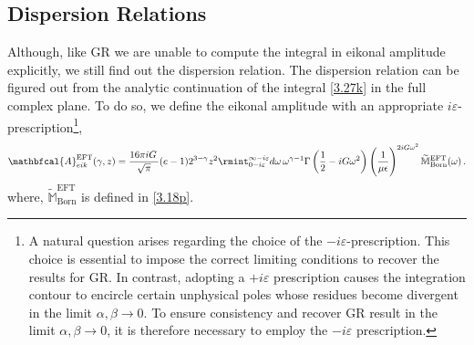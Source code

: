 
\noindent
\subsection{Dispersion Relations}
Although, like GR \cite{Adamo:2024mqn} we are unable to compute the integral in eikonal amplitude explicitly, we still find out the dispersion relation. The dispersion relation can be figured out from the analytic continuation of the integral \eqref{3.27k} in the full complex plane. To do so, we define the eikonal amplitude with an appropriate  $i\varepsilon$-prescription\footnote{A natural question arises regarding the choice of the \(-i\varepsilon\)-prescription. This choice is essential to impose the correct limiting conditions to recover the results for GR. In contrast, adopting a \(+i\varepsilon\) prescription causes the integration contour to encircle certain unphysical poles whose residues become divergent in the limit \(\alpha, \beta \to 0\). To ensure consistency and recover GR result in the limit  \(\alpha, \beta \to 0\), it is therefore necessary to employ the \(-i\varepsilon\) prescription.
},
\begin{align}
    \begin{split}
\mathbfcal{A}^{\textrm{EFT}}_{eik}(\gamma,z)=\frac{16\pi i G \,}{\sqrt{\pi}}(e-1)2^{3-\gamma}z^2\rmint_{0-i\varepsilon}^{\infty-i\varepsilon} d\omega \,\omega^{\gamma-1}\Gamma\left(\frac{1}{2}-iG\omega^2\right)\Bigg(\frac{1}{\mu \epsilon}\Bigg)^{2iG\omega^2}\,\widetilde{\mathbb{M}}_{\textrm{Born}}^{\textrm{EFT}}(\omega)\,. \label{3.26uu}
    \end{split}
    \end{align}
    where, $\widetilde{\mathbb{M}}_{\textrm{Born}}^{\textrm{EFT}} $ is defined in \eqref{3.18p}. 
   
